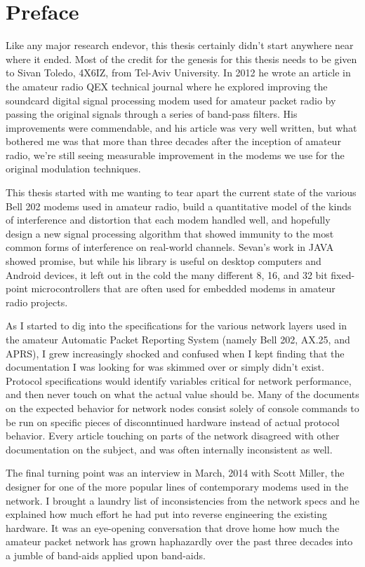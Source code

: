 \chapter*{Preface}

Like any major research endevor, this thesis certainly didn't start anywhere near
where it ended.
Most of the credit for the genesis for this thesis needs to be given to 
Sivan Toledo, 4X6IZ, from Tel-Aviv University. In 2012 he wrote an article in the
amateur radio QEX technical journal where he explored improving the soundcard 
digital signal processing modem used for amateur packet radio by passing the 
original signals through a series of band-pass filters. His improvements were
commendable, and his article was very well written, but what bothered me was that 
more than three decades after the inception of amateur radio, we're still seeing
measurable improvement in the modems we use for the original modulation techniques.

This thesis started with me wanting to tear apart the current state of the various
Bell 202 modems used in amateur radio, build a quantitative model of the kinds of
interference and distortion that each modem handled well, and hopefully design
a new signal processing algorithm that showed immunity to the most common forms of
interference on real-world channels. Sevan's work in JAVA showed promise, but 
while his library is useful on desktop computers and Android devices, it left 
out in the cold the many different 8, 16, and 32 bit fixed-point microcontrollers
that are often used for embedded modems in amateur radio projects.

As I started to dig into the specifications for the various network layers used
in the amateur Automatic Packet Reporting System (namely Bell 202, AX.25, and
APRS), I grew increasingly shocked and confused when I kept finding that the
documentation I was looking for was skimmed over or simply didn't exist. 
Protocol specifications would identify variables critical for network performance,
and then never touch on what the actual value should be. Many of the documents
on the expected behavior for network nodes consist solely of console commands
to be run on specific pieces of disconntinued hardware instead of actual protocol
behavior. Every article touching on parts of the network disagreed with 
other documentation on the subject, and was often internally inconsistent as well.

The final turning point was an interview in March, 2014 with Scott Miller, the
designer for one of the more popular lines of contemporary modems used in the
network.
I brought a laundry list of inconsistencies from the network specs and he
explained how much effort he had put into reverse engineering the existing 
hardware. It was an eye-opening conversation that drove home how much the 
amateur packet network has grown haphazardly over the past three decades into
a jumble of band-aids applied upon band-aids.

